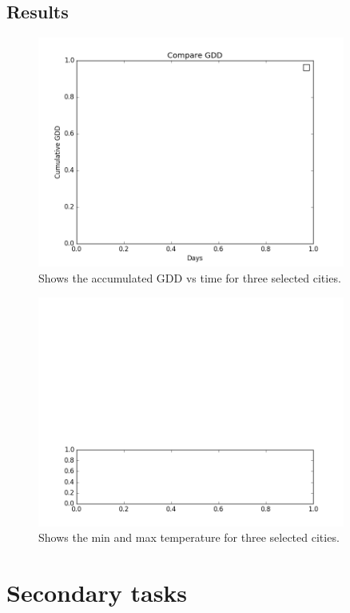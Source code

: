 \documentclass[12pt]{article}
\begin{document}
\subsection{Results}
	\begin{figure}[!htbp]
		\centering
		\includegraphics[width=0.9\textwidth]{./Output/CumulativeGDD.png} 
		\caption{\scriptsize Shows the accumulated GDD vs time for three selected cities.}\label{GDDplot}		  
	\end{figure}

	\begin{figure}[!htbp]
		\centering
		\includegraphics[width=0.9\textwidth]{./Output/CompareMaxMinTemp.png} 
		\caption{\scriptsize Shows the min and max temperature for three selected cities.}\label{GDDplot}		  
	\end{figure}

\pagebreak
\section{Secondary tasks}
\end{document}
